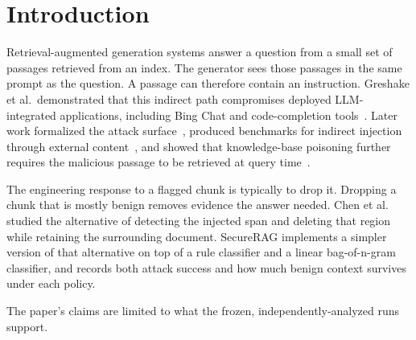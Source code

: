 \documentclass[journal]{IEEEtran}
\begin{document}
\section{Introduction}
\label{sec:introduction}

Retrieval-augmented generation systems answer a question from a small set of
passages retrieved from an index. The generator sees those passages in the same
prompt as the question. A passage can therefore contain an instruction.
Greshake et al.\ demonstrated that this indirect path compromises deployed
LLM-integrated applications, including Bing Chat and code-completion
tools~\cite{greshake2023indirect}. Later work formalized the attack
surface~\cite{liu2024formalizing}, produced benchmarks for indirect injection
through external content~\cite{yi2025bipia}, and showed that knowledge-base
poisoning further requires the malicious passage to be retrieved at query
time~\cite{zou2025poisonedrag}.

The engineering response to a flagged chunk is typically to drop it. Dropping a
chunk that is mostly benign removes evidence the answer needed. Chen et
al.~\cite{chen2025detecting} studied the alternative of detecting the injected
span and deleting that region while retaining the surrounding document.
SecureRAG implements a simpler version of that alternative on top of a rule
classifier and a linear bag-of-n-gram classifier, and records both attack
success and how much benign context survives under each policy.

The paper's claims are limited to what the frozen, independently-analyzed runs
support.
\end{document}
